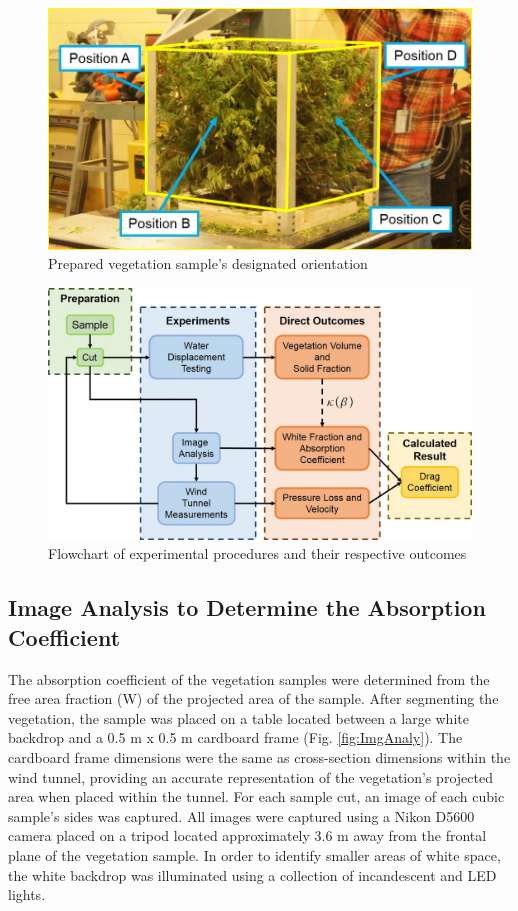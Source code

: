 \documentclass[12pt]{article}
\begin{document}
\begin{figure} [!]
	\centering 	\includegraphics[width=1.0\linewidth]{Picture3.jpg}
	\caption{Prepared vegetation sample's designated orientation}
	\label{fig:Vegpos}
\end{figure}

\begin{figure} [!]
	\centering 	\includegraphics[width=1.0\linewidth]{Picture4.jpg}
	\caption{Flowchart of experimental procedures and their respective outcomes}
	\label{fig:flowchart}
\end{figure}



\subsection{Image Analysis to Determine the Absorption Coefficient }
\label{ssec:headingscap}

The absorption coefficient of the vegetation samples were determined from the free area fraction (W) of the projected area of the sample. After segmenting the vegetation, the sample was placed on a table located between a large white backdrop and a 0.5 m x 0.5 m cardboard frame (Fig. \ref{fig:ImgAnaly}). The cardboard frame dimensions were the same as cross-section dimensions within the wind tunnel, providing an accurate representation of the vegetation's projected area when placed within the tunnel. For each sample cut, an image of each cubic sample's sides was captured. All images were captured using a Nikon D5600 camera placed on a tripod located approximately 3.6 \si{m} away from the frontal plane of the vegetation sample. In order to identify smaller areas of white space, the white backdrop was illuminated using a collection of incandescent and LED lights.\\
\end{document}
